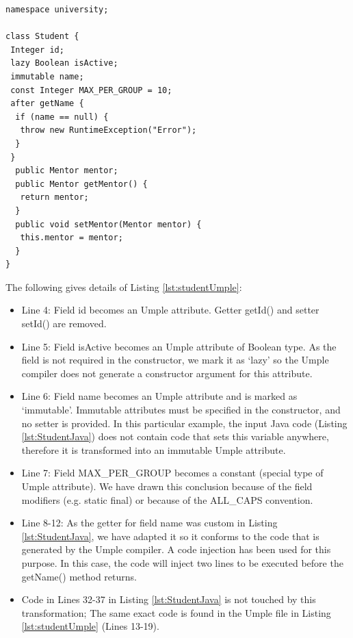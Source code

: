 \begin{lstlisting}[style=UmpleOut,caption=Student.ump,label=lst:studentUmple]
namespace university;

class Student { 
 Integer id; 
 lazy Boolean isActive; 
 immutable name; 
 const Integer MAX_PER_GROUP = 10; 
 after getName {
  if (name == null) { 
   throw new RuntimeException("Error");
  }
 }
  public Mentor mentor; 
  public Mentor getMentor() { 
   return mentor; 
  }
  public void setMentor(Mentor mentor) { 
   this.mentor = mentor; 
  } 
}
\end{lstlisting}


The following gives details of Listing \ref{lst:studentUmple}:
\begin{itemize}
\item Line 4: Field id becomes an Umple attribute. Getter getId() and setter setId() are removed.


\item Line 5: Field isActive becomes an Umple attribute of Boolean type.  As the field is not required in the constructor, we mark it as `lazy' so the Umple compiler does not generate a constructor argument for this attribute. 

\item Line 6: Field name becomes an Umple attribute and is marked as `immutable'. Immutable attributes must be specified in the constructor, and no setter is provided. In this particular example, the input Java code (Listing \ref{lst:StudentJava}) does not contain code that sets this variable anywhere, therefore it is transformed into an immutable Umple attribute. 

\item Line 7: Field MAX\_PER\_GROUP becomes a constant (special type of Umple attribute). We have drawn this conclusion because of the field modifiers (e.g. static final) or because of the ALL\_CAPS convention. 

\item Line 8-12: As the getter for field name was custom in Listing \ref{lst:StudentJava}, we have adapted it so it conforms to the code that is generated by the Umple compiler. A code injection has been used for this purpose. In this case, the code will inject two lines to be executed before the getName() method returns.

\item Code in Lines 32-37 in Listing \ref{lst:StudentJava} is not touched by this transformation; The same exact code is found in the Umple file in Listing \ref{lst:studentUmple} (Lines 13-19).

\end{itemize}

